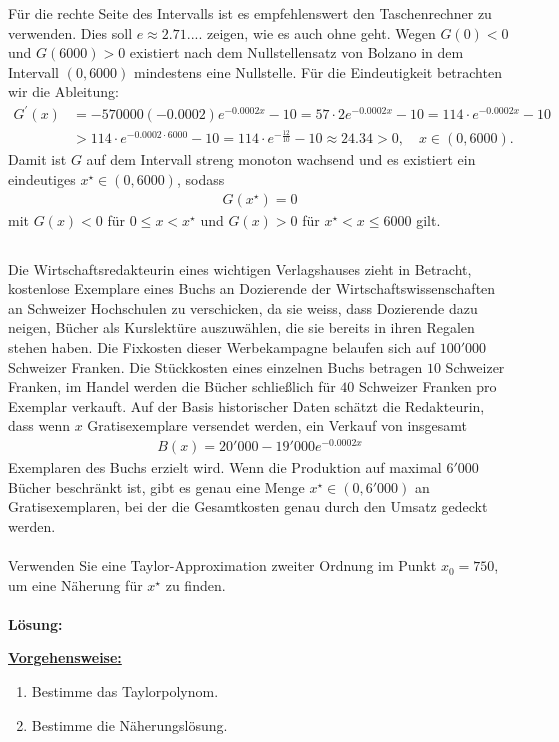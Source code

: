 Für die rechte Seite des Intervalls ist es empfehlenswert den Taschenrechner zu verwenden. Dies soll $e \approx 2.71....$ zeigen, wie es auch ohne geht. 
Wegen $G(0) < 0$ und $G(6000) > 0$ existiert nach dem Nullstellensatz von Bolzano in dem Intervall $(0,6000)$ mindestens eine Nullstelle. Für die Eindeutigkeit betrachten wir die Ableitung:
\begin{align*}
	G^\prime(x)
	&=
	-570000 ( - 0.0002) e^{-0.0002 x} - 10
	=
	57 \cdot 2 e^{-0.0002 x} - 10
	=
	114 \cdot e^{-0.0002 x}- 10\\
	&> 
	114 \cdot e^{-0.0002 \cdot 6000} - 10
	=
	114 \cdot e^{-\frac{12}{10}} - 10 \approx 24.34  > 0, 
	\quad x \in ( 0 , 6000).
\end{align*}
Damit ist $G$ auf dem Intervall streng monoton wachsend und es existiert ein eindeutiges $x^\star \in (0,6000) $, sodass 
\begin{align*}
	G(x^\star) = 0
\end{align*} 
mit $G(x) < 0$ für $0 \leq x < x^\star$ und $G(x) > 0$ für $x^\star < x \leq 6000$ gilt.
\newpage

\subsection*{}
Die Wirtschaftsredakteurin eines wichtigen Verlagshauses zieht in Betracht,
kostenlose Exemplare eines Buchs an Dozierende der Wirtschaftswissenschaften an Schweizer Hochschulen zu verschicken, da sie weiss, dass Dozierende dazu neigen, Bücher als Kurslektüre auszuwählen, die sie bereits in ihren Regalen stehen haben. Die Fixkosten dieser Werbekampagne belaufen sich auf $100'000$ Schweizer Franken.
Die Stückkosten eines einzelnen Buchs betragen $10$ Schweizer Franken, im Handel werden die Bücher schließlich für $40$ Schweizer Franken pro Exemplar verkauft.
Auf der Basis historischer Daten schätzt die Redakteurin, dass wenn $x$ Gratisexemplare versendet werden, ein Verkauf von insgesamt
\begin{align*}
	B(x) = 20'000 - 19'000 e^{-0.0002 x }
\end{align*}
Exemplaren des Buchs erzielt wird. Wenn die Produktion auf maximal $6'000$ Bücher beschränkt ist, gibt es genau eine Menge $ x^\star \in (0, 6'000)$ an Gratisexemplaren, bei der die Gesamtkosten genau durch den Umsatz gedeckt werden.\\
\\
Verwenden Sie eine Taylor-Approximation zweiter Ordnung im Punkt $x_0 = 750$, um eine Näherung für $x^\star$ zu finden.
\\
 \\
\textbf{Lösung:}
\begin{mdframed}
\underline{\textbf{Vorgehensweise:}}
\renewcommand{\labelenumi}{\theenumi.}
\begin{enumerate}
\item Bestimme das Taylorpolynom.
\item Bestimme die Näherungslösung. 
\end{enumerate}
\end{mdframed}

